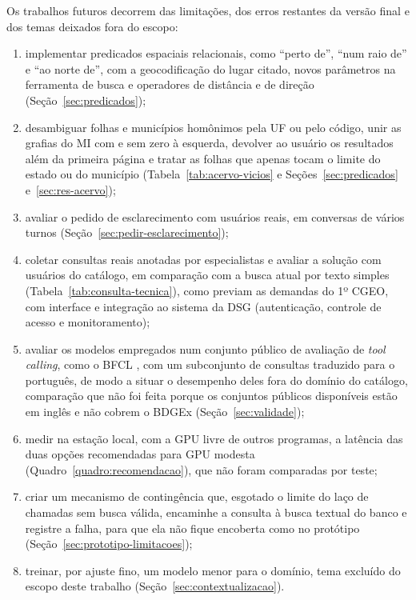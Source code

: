 Os trabalhos futuros decorrem das limitações, dos erros restantes da versão final e dos temas deixados fora do escopo:
\begin{enumerate}
  \item implementar predicados espaciais relacionais, como ``perto de'', ``num raio de'' e ``ao norte de'', com a geocodificação do lugar citado, novos parâmetros na ferramenta de busca e operadores de distância e de direção (Seção~\ref{sec:predicados});
  \item desambiguar folhas e municípios homônimos pela UF ou pelo código, unir as grafias do MI com e sem zero à esquerda, devolver ao usuário os resultados além da primeira página e tratar as folhas que apenas tocam o limite do estado ou do município (Tabela~\ref{tab:acervo-vicios} e Seções~\ref{sec:predicados} e~\ref{sec:res-acervo});
  \item avaliar o pedido de esclarecimento com usuários reais, em conversas de vários turnos (Seção~\ref{sec:pedir-esclarecimento});
  \item coletar consultas reais anotadas por especialistas e avaliar a solução com usuários do catálogo, em comparação com a busca atual por texto simples (Tabela~\ref{tab:consulta-tecnica}), como previam as demandas do 1º CGEO, com interface e integração ao sistema da DSG (autenticação, controle de acesso e monitoramento);
  \item avaliar os modelos empregados num conjunto público de avaliação de \textit{tool calling}, como o BFCL \cite{patil2025berkeley}, com um subconjunto de consultas traduzido para o português, de modo a situar o desempenho deles fora do domínio do catálogo, comparação que não foi feita porque os conjuntos públicos disponíveis estão em inglês e não cobrem o BDGEx (Seção~\ref{sec:validade});
  \item medir na estação local, com a GPU livre de outros programas, a latência das duas opções recomendadas para GPU modesta (Quadro~\ref{quadro:recomendacao}), que não foram comparadas por teste;
  \item criar um mecanismo de contingência que, esgotado o limite do laço de chamadas sem busca válida, encaminhe a consulta à busca textual do banco e registre a falha, para que ela não fique encoberta como no protótipo (Seção~\ref{sec:prototipo-limitacoes});
  \item treinar, por ajuste fino, um modelo menor para o domínio, tema excluído do escopo deste trabalho (Seção~\ref{sec:contextualizacao}).
\end{enumerate}
